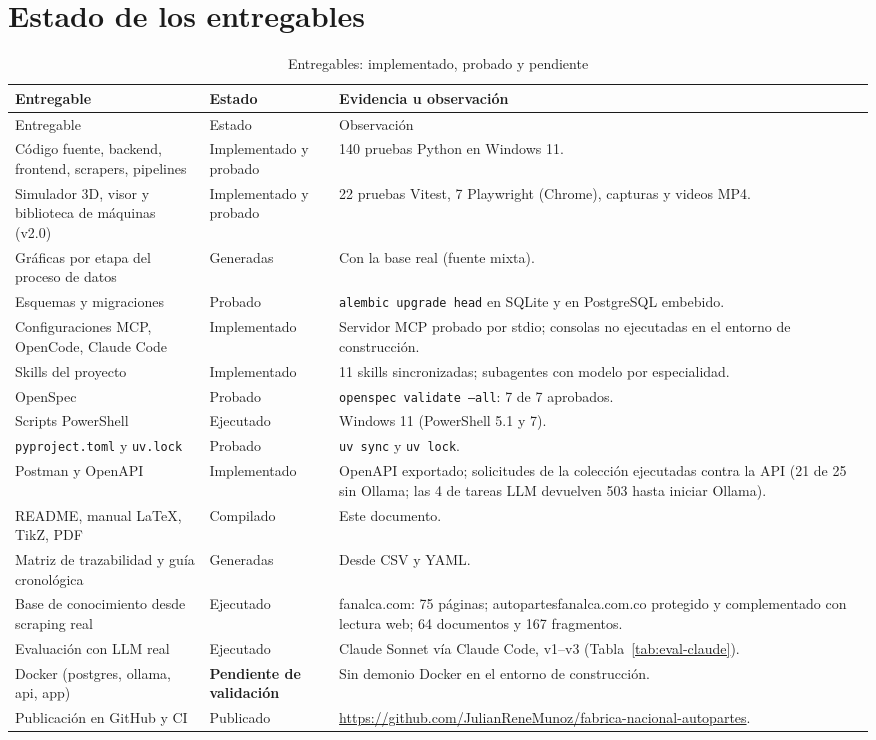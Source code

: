 \section{Estado de los entregables}
\begin{longtable}{@{}P{5.4cm}P{2.6cm}P{7.0cm}@{}}
\caption{Entregables: implementado, probado y pendiente}\label{tab:entregables}\\\toprule
Entregable & Estado & Evidencia u observación\\\midrule\endfirsthead
\toprule Entregable & Estado & Observación\\\midrule\endhead
Código fuente, backend, frontend, scrapers, pipelines & Implementado y probado & 140 pruebas Python en Windows 11.\\
Simulador 3D, visor y biblioteca de máquinas (v2.0) & Implementado y probado & 22 pruebas Vitest, 7 Playwright (Chrome), capturas y videos MP4.\\
Gráficas por etapa del proceso de datos & Generadas & Con la base real (fuente mixta).\\
Esquemas y migraciones & Probado & \texttt{alembic upgrade head} en SQLite y en PostgreSQL embebido.\\
Configuraciones MCP, OpenCode, Claude Code & Implementado & Servidor MCP probado por stdio; consolas no ejecutadas en el entorno de construcción.\\
Skills del proyecto & Implementado & 11 skills sincronizadas; subagentes con modelo por especialidad.\\
OpenSpec & Probado & \texttt{openspec validate --all}: 7 de 7 aprobados.\\
Scripts PowerShell & Ejecutado & Windows 11 (PowerShell 5.1 y 7).\\
\texttt{pyproject.toml} y \texttt{uv.lock} & Probado & \texttt{uv sync} y \texttt{uv lock}.\\
Postman y OpenAPI & Implementado & OpenAPI exportado; solicitudes de la colección ejecutadas contra la API (21 de 25 sin Ollama; las 4 de tareas LLM devuelven 503 hasta iniciar Ollama).\\
README, manual LaTeX, TikZ, PDF & Compilado & Este documento.\\
Matriz de trazabilidad y guía cronológica & Generadas & Desde CSV y YAML.\\
Base de conocimiento desde scraping real & Ejecutado & fanalca.com: 75 páginas; autopartesfanalca.com.co protegido y complementado con lectura web; 64 documentos y 167 fragmentos.\\
Evaluación con LLM real & Ejecutado & Claude Sonnet vía Claude Code, v1--v3 (Tabla~\ref{tab:eval-claude}).\\
Docker (postgres, ollama, api, app) & \textbf{Pendiente de validación} & Sin demonio Docker en el entorno de construcción.\\
Publicación en GitHub y CI & Publicado & \url{https://github.com/JulianReneMunoz/fabrica-nacional-autopartes}.\\\bottomrule
\end{longtable}

